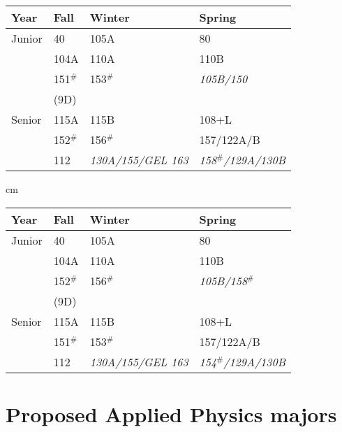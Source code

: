 \documentclass[12pt]{article}
\begin{document}
\newpage
{}
  \label{tbl:proposed-astro}
\begin{center}
\begin{tabular}{|l|l|l|l|}
\hline
Year      & Fall    & Winter & Spring \\
\hline
Junior    & 40         & 105A     & 80 \\
          & 104A       & 110A     & 110B \\
          & 151$^\#$   & 153$^\#$ & {\it 105B/150} \\         
          & (9D)       &             &  \\         
\hline
Senior   & 115A     & 115B & 108+L\\
         & 152$^\#$ & 156$^\#$ & 157/122A/B \\
         & 112   & {\it 130A/155/GEL 163} & {\it 158$^\#$/129A/130B} \\
\hline 
\end{tabular}

 cm

\begin{tabular}{|l|l|l|l|}
\hline
Year      & Fall    & Winter & Spring \\
\hline
Junior    & 40         & 105A     & 80 \\
          & 104A       & 110A     & 110B \\
          & 152$^\#$   & 156$^\#$ & {\it 105B/158$^\#$} \\         
          & (9D)       &             &  \\         
\hline
Senior   & 115A     & 115B & 108+L\\
         & 151$^\#$ & 153$^\#$ & 157/122A/B \\
         & 112   & {\it 130A/155/GEL 163} & {\it 154$^\#$/129A/130B} \\
\hline 
\end{tabular}
\vskip 0.5cm
\end{center}

\section{Proposed Applied Physics majors}
\end{document}
